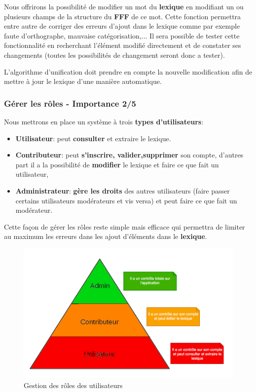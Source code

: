 {Nous offrirons la possibilité de modifier un mot du \textbf{lexique} en modifiant un ou plusieurs champs de la structure du \textbf{FFF} de ce mot. Cette fonction permettra entre autre de corriger des erreurs d'ajout dans le lexique comme par exemple faute d'orthographe, mauvaise catégorisation,... Il sera possible de tester cette fonctionnalité en recherchant l'élément modifié directement et de constater ses changements (toutes les possibilités de changement seront donc a tester).\par} L'algorithme d'unification doit prendre en compte la nouvelle modification afin de mettre à jour le lexique d'une manière automatique.
 
\subsubsection{Gérer les rôles - Importance 2/5}
    
Nous mettrons en place un système à trois \textbf{types d'utilisateurs}:
\begin{itemize}
\item \textbf{Utilisateur}:  peut \textbf{consulter} et extraire le lexique.
\item \textbf{Contributeur}: peut \textbf{s'inscrire, valider,supprimer} son compte, d'autres part il a la possibilité de \textbf{modifier} le lexique et faire ce que fait un utilisateur,
\item \textbf{Administrateur}: \textbf{gère les droits} des autres utilisateurs (faire passer certains utilisateurs modérateurs et vis versa) et peut faire ce que fait un modérateur.
\end{itemize}
{Cette façon de gérer les rôles reste simple mais efficace qui permettra de limiter au maximum les erreurs dans les ajout d'éléments dans le \textbf{lexique}.\par}

\begin{figure}[ht]
    \centering
    \includegraphics[scale=0.5]{role.png}
    \caption{Gestion des rôles des utilisateurs }
\end{figure}
\newpage
    


